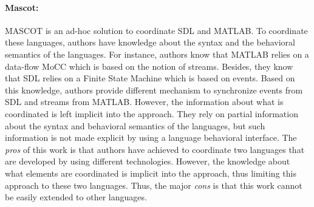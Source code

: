  
{\paragraph{Mascot: }
MASCOT is an ad-hoc solution to coordinate SDL and MATLAB. To coordinate these languages, authors have knowledge about the syntax and the behavioral semantics of the languages. For instance, authors know that MATLAB relies on a data-flow MoCC which is based on the notion of streams. Besides, they know that SDL relies on a Finite State Machine which is based on events. Based on this knowledge, authors provide different mechanism to synchronize events from SDL and streams from MATLAB. However, the information about what is coordinated is left implicit into the approach. They rely on partial information about the syntax and behavioral semantics of the languages, but such information is not made explicit by using a language behavioral interface. The \emph{pros} of this work is that authors have achieved to coordinate two languages that are developed by using different technologies. However, the knowledge about what elements are coordinated is implicit into the approach, thus limiting this approach to these two languages. Thus, the major \emph{cons} is that this work cannot be easily extended to other languages. 
	



}
